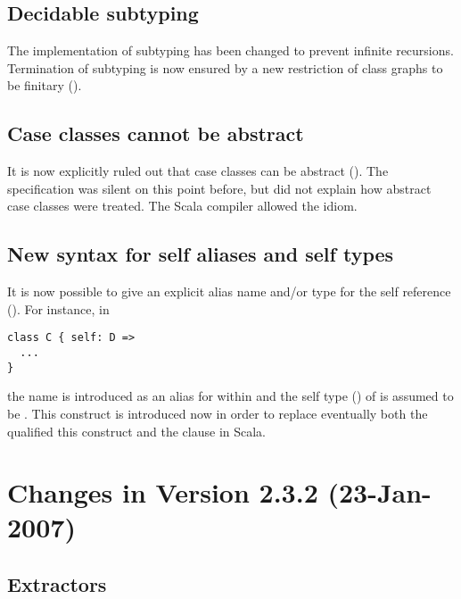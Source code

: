 \subsection*{Decidable subtyping}

The implementation of subtyping has been changed to prevent infinite
recursions. Termination of subtyping is now ensured by a new
restriction of class graphs to be finitary
().

\subsection*{Case classes cannot be abstract}

It is now explicitly ruled out that case classes can be abstract
(). The specification was silent on this point
before, but did not explain how abstract case classes were
treated. The Scala compiler allowed the idiom.

\subsection*{New syntax for self aliases and self types}

It is now possible to give an explicit alias name and/or type for the
self reference  (). For instance, in
\begin{lstlisting}
class C { self: D => 
  ...
}
\end{lstlisting}
the name  is introduced as an alias for  within
 and the self type () of  is
assumed to be . This construct is introduced now in order to
replace eventually both the qualified this construct  and
the  clause in Scala.

\section{Changes in Version 2.3.2 (23-Jan-2007)}

\subsection*{Extractors}


